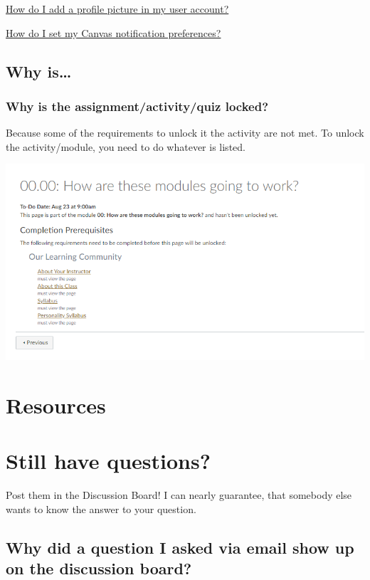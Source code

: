 \href{https://community.canvaslms.com/docs/DOC-10599-4212710334}{How do I add a profile picture in my user account?}

\href{https://community.canvaslms.com/docs/DOC-10624-4212710344}{How do I set my Canvas notification preferences?}

\hypertarget{why-is}{%
\subsection{Why is\ldots{}}\label{why-is}}

\hypertarget{why-is-the-assignmentactivityquiz-locked}{%
\subsubsection{Why is the assignment/activity/quiz locked?}\label{why-is-the-assignmentactivityquiz-locked}}

Because some of the requirements to unlock it the activity are not met. To unlock the activity/module, you need to do whatever is listed.

\begin{center}\includegraphics[width=0.5\linewidth]{img/requirements} \end{center}

\hypertarget{resources-1}{%
\section{Resources}\label{resources-1}}

\hypertarget{still-have-questions}{%
\section{Still have questions?}\label{still-have-questions}}

Post them in the Discussion Board! I can nearly guarantee, that somebody else wants to know the answer to your question.

\hypertarget{why-did-a-question-i-asked-via-email-show-up-on-the-discussion-board}{%
\subsection{Why did a question I asked via email show up on the discussion board?}\label{why-did-a-question-i-asked-via-email-show-up-on-the-discussion-board}}

